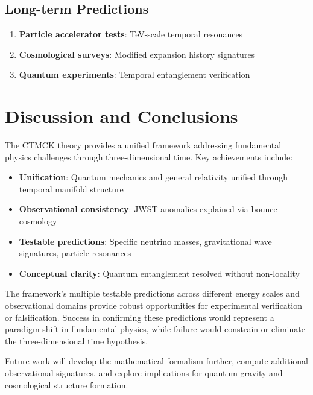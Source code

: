 \documentclass[reprint,amsmath,amssymb,aps,prd,nofootinbib]{revtex4-2}
\begin{document}
\subsection{Long-term Predictions}

\begin{enumerate}
\item \textbf{Particle accelerator tests}: TeV-scale temporal resonances
\item \textbf{Cosmological surveys}: Modified expansion history signatures
\item \textbf{Quantum experiments}: Temporal entanglement verification
\end{enumerate}

\section{Discussion and Conclusions}\label{sec:conclusions}

The CTMCK theory provides a unified framework addressing fundamental physics challenges through three-dimensional time.  Key achievements include:

\begin{itemize}
\item \textbf{Unification}: Quantum mechanics and general relativity unified through temporal manifold structure
\item \textbf{Observational consistency}: JWST anomalies explained via bounce cosmology
\item \textbf{Testable predictions}: Specific neutrino masses, gravitational wave signatures, particle resonances
\item \textbf{Conceptual clarity}: Quantum entanglement resolved without non-locality
\end{itemize}

The framework's multiple testable predictions across different energy scales and observational domains provide robust opportunities for experimental verification or falsification. Success in confirming these predictions would represent a paradigm shift in fundamental physics, while failure would constrain or eliminate the three-dimensional time hypothesis.

Future work will develop the mathematical formalism further, compute additional observational signatures, and explore implications for quantum gravity and cosmological structure formation.

\end{document}
